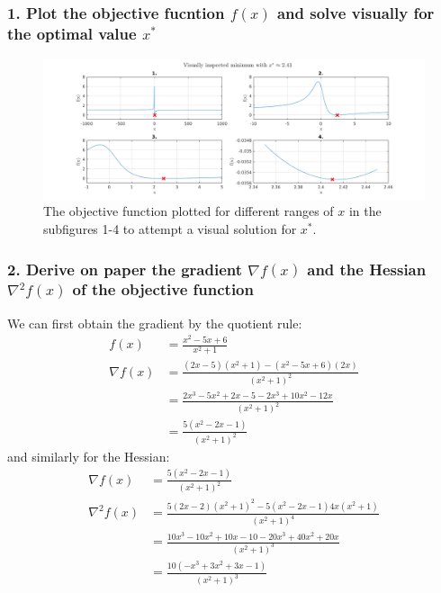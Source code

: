 \documentclass[letterpaper,12pt]{article}
\begin{document}
\subsubsection*{1. Plot the objective fucntion $f(x)$ and solve visually for the optimal value $x^*$}
\begin{figure}[!htbp]
	\centering
	\includegraphics[width=1\textwidth]{img/2-1.png}
	\caption{The objective function plotted for different ranges of $x$ in the subfigures 1-4 to attempt a visual solution for $x^*$.}
	\label{img:2-1-visual}
\end{figure}

\subsubsection*{2. Derive on paper the gradient $\nabla f(x)$ and the Hessian $\nabla^2 f(x)$ of the objective function}
We can first obtain the gradient by the quotient rule:
\begin{equation}
\begin{aligned}
	f(x) &= \frac{x^2 - 5x + 6}{x^2 + 1} \\
	\nabla f(x) &= \frac{(2x - 5)(x^2 + 1) - (x^2 - 5x + 6)(2x)}{(x^2 + 1)^2} \\
	&= \frac{2x^3 -5x^2 + 2x -5 -2x^3 + 10x^2 - 12x}{(x^2 + 1)^2} \\
	&= \frac{5(x^2 - 2x - 1)}{(x^2 + 1)^2}
\end{aligned}
\end{equation}
and similarly for the Hessian:
\begin{equation}
\begin{aligned}
	\nabla f(x) &= \frac{5(x^2 - 2x - 1)}{(x^2 + 1)^2} \\
	\nabla^2 f(x) &= \frac{5(2x - 2)(x^2 + 1)^2 - 5(x^2 - 2x - 1)4x(x^2 + 1)}{(x^2 + 1)^4} \\
	&= \frac{10x^3 - 10x^2 + 10x - 10 - 20x^3 + 40x^2 + 20x}{(x^2 + 1)^3} \\
	&= \frac{10(-x^3 + 3x^2 + 3x - 1)}{(x^2 + 1)^3}
\end{aligned}
\end{equation}
\end{document}
